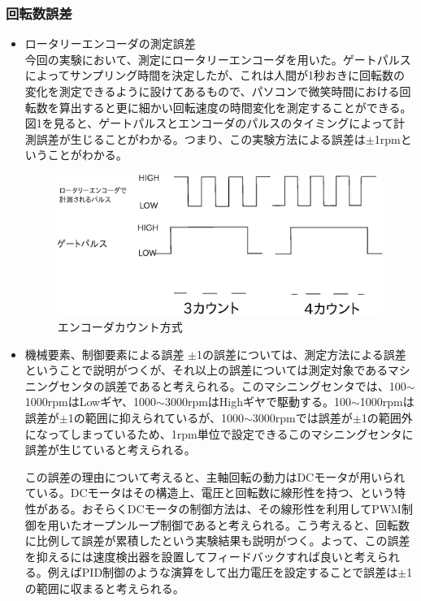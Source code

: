 \documentclass[a4j,twoside,openright,11pt]{jarticle}
\begin{document}
\subsubsection{回転数誤差}
\begin{itemize}
\item ロータリーエンコーダの測定誤差\\
今回の実験において、測定にロータリーエンコーダを用いた。ゲートパルスによってサンプリング時間を決定したが、これは人間が1秒おきに回転数の変化を測定できるように設けてあるもので、パソコンで微笑時間における回転数を算出すると更に細かい回転速度の時間変化を測定することができる。図1を見ると、ゲートパルスとエンコーダのパルスのタイミングによって計測誤差が生じることがわかる。つまり、この実験方法による誤差は$\pm$1rpmということがわかる。
\begin{figure}[htbp]
\begin{center}
\includegraphics[width=12cm]{encoder.eps}
\end{center}
\caption{エンコーダカウント方式}
\end{figure}

\item 機械要素、制御要素による誤差
$\pm$1の誤差については、測定方法による誤差ということで説明がつくが、それ以上の誤差については測定対象であるマシニングセンタの誤差であると考えられる。このマシニングセンタでは、100$\sim$1000rpmはLowギヤ、1000$\sim$3000rpmはHighギヤで駆動する。100$\sim$1000rpmは誤差が$\pm$1の範囲に抑えられているが、1000$\sim$3000rpmでは誤差が$\pm$1の範囲外になってしまっているため、1rpm単位で設定できるこのマシニングセンタに誤差が生じていると考えられる。\\
\par
この誤差の理由について考えると、主軸回転の動力はDCモータが用いられている。DCモータはその構造上、電圧と回転数に線形性を持つ、という特性がある。おそらくDCモータの制御方法は、その線形性を利用してPWM制御を用いたオープンループ制御であると考えられる。こう考えると、回転数に比例して誤差が累積したという実験結果も説明がつく。よって、この誤差を抑えるには速度検出器を設置してフィードバックすれば良いと考えられる。例えばPID制御のような演算をして出力電圧を設定することで誤差は$\pm$1の範囲に収まると考えられる。
\end{itemize}
\end{document}
